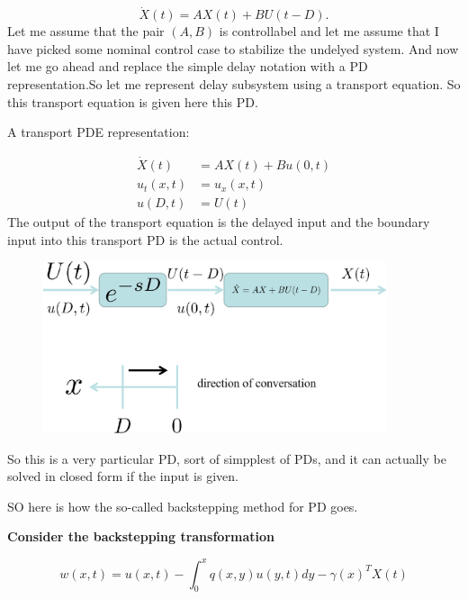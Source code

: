 \documentclass[idxtotoc,hyperref,openany]{labbook} %
\begin{document}
\begin{equation}
\dot{X}(t) = AX(t) + BU(t-D).
\end{equation} Let me assume that the pair $(A, B)$ is controllabel and let me assume that I have picked some nominal control case to stabilize the undelyed system. And now let me go ahead and replace the simple delay notation with a PD representation.So let me represent delay subsystem using a transport equation. So this transport equation is given here this PD.

A transport PDE representation:

\begin{equation}
  \begin{aligned}
      \dot{X}(t) &= AX(t) + Bu(0,t)\\
      u_t(x,t) &= u_x(x,t)\\
      u(D,t) &= U(t)
  \end{aligned}
\end{equation} The output of the transport equation is the delayed input and the boundary input into this transport PD is the actual control.

\begin{figure}[ht!]
\centering
\includegraphics[width=0.9\textwidth]{figure_1.png}
\end{figure} So this is a very particular PD, sort of simpplest of PDs, and it can actually be solved in closed form if the input is given.

SO here is how the so-called backstepping method for PD goes.

\bf{Consider the backstepping transformation}

\begin{equation}
  w(x,t) = u(x,t) - \int_0^x q(x,y)u(y,t)dy - \gamma(x)^T X(t)
\end{equation}
\end{document}
